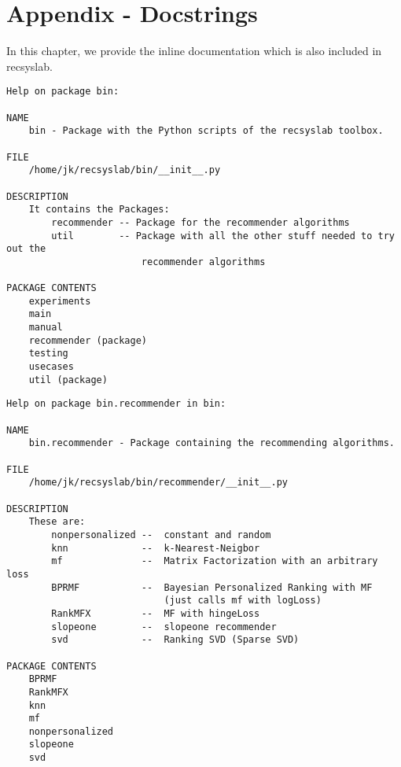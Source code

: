 \chapter{Appendix - Docstrings}
In this chapter, we provide the inline documentation which is also included
in recsyslab.

\begin{lstlisting}[style=docstring]
Help on package bin:

NAME
    bin - Package with the Python scripts of the recsyslab toolbox.

FILE
    /home/jk/recsyslab/bin/__init__.py

DESCRIPTION
    It contains the Packages:
        recommender -- Package for the recommender algorithms
        util        -- Package with all the other stuff needed to try out the
                        recommender algorithms

PACKAGE CONTENTS
    experiments
    main
    manual
    recommender (package)
    testing
    usecases
    util (package)
\end{lstlisting}

\begin{lstlisting}[style=docstring]
Help on package bin.recommender in bin:

NAME
    bin.recommender - Package containing the recommending algorithms.

FILE
    /home/jk/recsyslab/bin/recommender/__init__.py

DESCRIPTION
    These are:
        nonpersonalized --  constant and random
        knn             --  k-Nearest-Neigbor
        mf              --  Matrix Factorization with an arbitrary loss
        BPRMF           --  Bayesian Personalized Ranking with MF
                            (just calls mf with logLoss)
        RankMFX         --  MF with hingeLoss
        slopeone        --  slopeone recommender
        svd             --  Ranking SVD (Sparse SVD)

PACKAGE CONTENTS
    BPRMF
    RankMFX
    knn
    mf
    nonpersonalized
    slopeone
    svd
\end{lstlisting}

